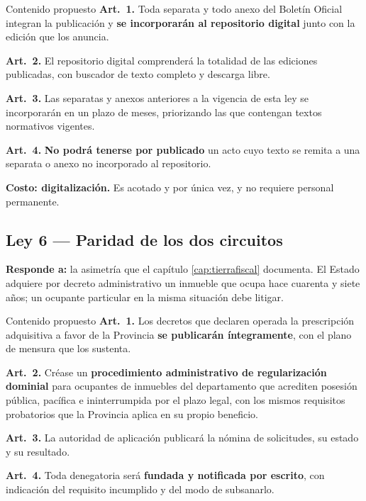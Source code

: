 \begin{ficha}{Contenido propuesto}
\textbf{Art.\ 1.} Toda separata y todo anexo del Boletín Oficial integran la publicación y
\textbf{se incorporarán al repositorio digital} junto con la edición que los anuncia.

\textbf{Art.\ 2.} El repositorio digital comprenderá la totalidad de las ediciones publicadas,
con buscador de texto completo y descarga libre.

\textbf{Art.\ 3.} Las separatas y anexos anteriores a la vigencia de esta ley se incorporarán
en un plazo de \underline{\hspace{1.2cm}} meses, priorizando las que contengan textos
normativos vigentes.

\textbf{Art.\ 4.} \textbf{No podrá tenerse por publicado} un acto cuyo texto se remita a una
separata o anexo no incorporado al repositorio.
\end{ficha}

\textbf{Costo: digitalización.} Es acotado y por única vez, y no requiere personal permanente.

\subsection{Ley 6 --- Paridad de los dos circuitos}

\textbf{Responde a:} la asimetría que el capítulo \ref{cap:tierrafiscal} documenta. El Estado
adquiere por decreto administrativo un inmueble que ocupa hace cuarenta y siete años; un
ocupante particular en la misma situación debe litigar.

\begin{ficha}{Contenido propuesto}
\textbf{Art.\ 1.} Los decretos que declaren operada la prescripción adquisitiva a favor de la
Provincia \textbf{se publicarán íntegramente}, con el plano de mensura que los sustenta.

\textbf{Art.\ 2.} Créase un \textbf{procedimiento administrativo de regularización dominial}
para ocupantes de inmuebles del departamento que acrediten posesión pública, pacífica e
ininterrumpida por el plazo legal, con los mismos requisitos probatorios que la Provincia
aplica en su propio beneficio.

\textbf{Art.\ 3.} La autoridad de aplicación publicará la nómina de solicitudes, su estado y
su resultado.

\textbf{Art.\ 4.} Toda denegatoria será \textbf{fundada y notificada por escrito}, con
indicación del requisito incumplido y del modo de subsanarlo.
\end{ficha}

